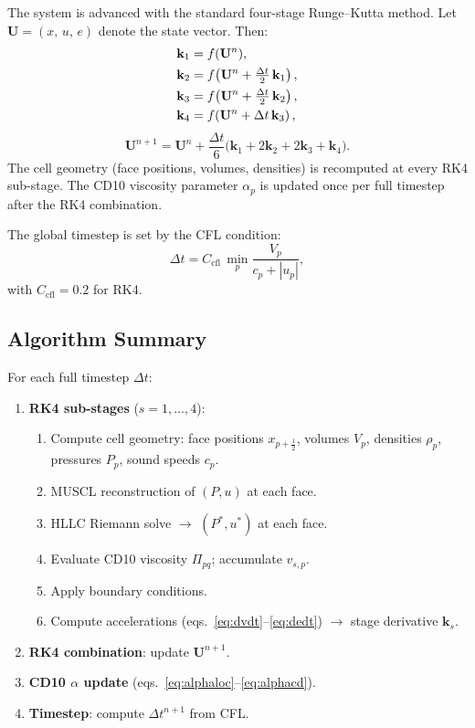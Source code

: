 \documentclass[twocolumn]{aastex63}
\newcommand{\vel}{{u}}
\begin{document}
The system is advanced with the standard four-stage Runge--Kutta method.
Let $\mathbf{U} = (x,\,\vel,\,e)$ denote the state vector.  Then:
\begin{align}
  \mathbf{k}_1 &= f(\mathbf{U}^n), \notag\\
  \mathbf{k}_2 &= f\!\left(\mathbf{U}^n + \tfrac{\Delta t}{2}\,\mathbf{k}_1\right), \notag\\
  \mathbf{k}_3 &= f\!\left(\mathbf{U}^n + \tfrac{\Delta t}{2}\,\mathbf{k}_2\right), \notag\\
  \mathbf{k}_4 &= f\!\left(\mathbf{U}^n + \Delta t\,\mathbf{k}_3\right),
\end{align}
\begin{equation}
  \mathbf{U}^{n+1} = \mathbf{U}^n
    + \frac{\Delta t}{6}\bigl(\mathbf{k}_1
      + 2\mathbf{k}_2 + 2\mathbf{k}_3 + \mathbf{k}_4\bigr).
\end{equation}
The cell geometry (face positions, volumes, densities) is recomputed
at every RK4 sub-stage.
The CD10 viscosity parameter $\alpha_p$ is updated once per full
timestep after the RK4 combination.

The global timestep is set by the CFL condition:
\begin{equation}
  \Delta t = C_\mathrm{cfl}\,\min_p
    \frac{V_p}{c_p + |\vel_p|},
\end{equation}
with $C_\mathrm{cfl} = 0.2$ for RK4.


\subsection{Algorithm Summary}

For each full timestep $\Delta t$:
\begin{enumerate}
  \item \textbf{RK4 sub-stages} ($s = 1,\ldots,4$):
    \begin{enumerate}[label=(\alph*)]
      \item Compute cell geometry:
            face positions $x_{p+\frac{1}{2}}$, volumes $V_p$,
            densities $\rho_p$, pressures $P_p$, sound speeds $c_p$.
      \item MUSCL reconstruction of $(P,\vel)$ at each face.
      \item HLLC Riemann solve $\rightarrow$ $(P^*,\vel^*)$ at each face.
      \item Evaluate CD10 viscosity $\Pi_{pq}$; accumulate $v_{s,p}$.
      \item Apply boundary conditions.
      \item Compute accelerations (eqs.~\ref{eq:dvdt}--\ref{eq:dedt})
            $\rightarrow$ stage derivative $\mathbf{k}_s$.
    \end{enumerate}
  \item \textbf{RK4 combination}: update $\mathbf{U}^{n+1}$.
  \item \textbf{CD10 $\alpha$ update}
        (eqs.~\ref{eq:alphaloc}--\ref{eq:alphacd}).
  \item \textbf{Timestep}: compute $\Delta t^{n+1}$ from CFL.
\end{enumerate}
\end{document}
